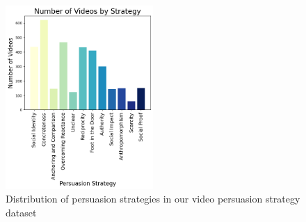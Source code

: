 \begin{figure}[!h]
    \centering
    \includegraphics[width=0.5\textwidth]{images/video_strategies.png}
    \caption{Distribution of persuasion strategies in our video persuasion strategy dataset}
    \label{fig:persuasion-strategy-dataset-distribution}
\end{figure}


